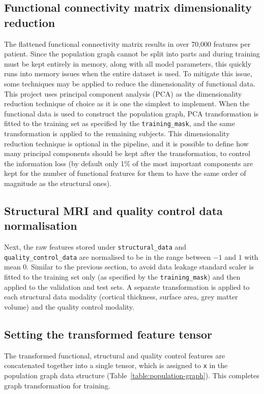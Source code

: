 \subsection{Functional connectivity matrix dimensionality reduction}
The flattened functional connectivity matrix results in over 70,000 features per patient. Since the population graph cannot be split into parts and during training must be kept entirely in memory, along with all model parameters, this quickly runs into memory issues when the entire dataset is used. To mitigate this issue, some techniques may be applied to reduce the dimensionality of functional data. This project uses principal component analysis (PCA) as the dimensionality reduction technique of choice as it is one the simplest to implement. When the functional data is used to construct the population graph, PCA transformation is fitted to the training set as specified by the \texttt{training\_mask}, and the same transformation is applied to the remaining subjects. This dimensionality reduction technique is optional in the pipeline, and it is possible to define how many principal components should be kept after the transformation, to control the information loss (by default only 1\% of the most important components are kept for the number of functional features for them to have the same order of magnitude as the structural ones). 

\subsection{Structural MRI and quality control data normalisation}
Next, the raw features stored under \texttt{structural\_data} and \texttt{quality\_control\_data} are normalised to be in the range between $-1$ and $1$ with mean 0. Similar to the previous section, to avoid data leakage standard scaler is fitted to the training set only (as specified by the \texttt{training\_mask}) and then applied to the validation and test sets. A separate transformation is applied to each structural data modality (cortical thickness, surface area, grey matter volume) and the quality control modality.

\subsection{Setting the transformed feature tensor}
The transformed functional, structural and quality control features are concatenated together into a single tensor, which is assigned to \texttt{x} in the population graph data structure (Table~\ref{table:population-graph}). This completes graph transformation for training.

